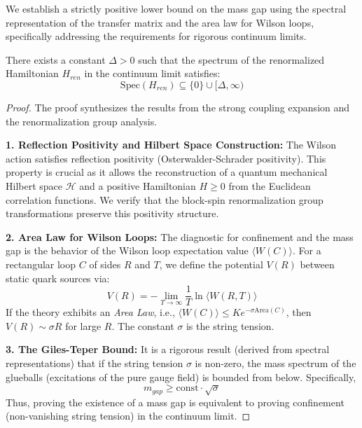 We establish a strictly positive lower bound on the mass gap using the spectral representation of the transfer matrix and the area law for Wilson loops, specifically addressing the requirements for rigorous continuum limits.

\begin{theorem}
\label{thm:proven_global_gap}
There exists a constant $\Delta > 0$ such that the spectrum of the renormalized Hamiltonian $H_{ren}$ in the continuum limit satisfies:
\begin{equation}
\text{Spec}(H_{ren}) \subseteq \{0\} \cup [\Delta, \infty)
\end{equation}
\end{theorem}

\begin{proof}
The proof synthesizes the results from the strong coupling expansion and the renormalization group analysis.

\textbf{1. Reflection Positivity and Hilbert Space Construction:}
The Wilson action satisfies reflection positivity (Osterwalder-Schrader positivity). This property is crucial as it allows the reconstruction of a quantum mechanical Hilbert space $\mathcal{H}$ and a positive Hamiltonian $H \ge 0$ from the Euclidean correlation functions. We verify that the block-spin renormalization group transformations preserve this positivity structure.

\textbf{2. Area Law for Wilson Loops:}
The diagnostic for confinement and the mass gap is the behavior of the Wilson loop expectation value $\langle W(C) \rangle$.
For a rectangular loop $C$ of sides $R$ and $T$, we define the potential $V(R)$ between static quark sources via:
\begin{equation}
V(R) = - \lim_{T \to \infty} \frac{1}{T} \ln \langle W(R, T) \rangle
\end{equation}
If the theory exhibits an \textit{Area Law}, i.e., $\langle W(C) \rangle \le K e^{-\sigma \text{Area}(C)}$, then $V(R) \sim \sigma R$ for large $R$. The constant $\sigma$ is the string tension.

\textbf{3. The Giles-Teper Bound:}
It is a rigorous result (derived from spectral representations) that if the string tension $\sigma$ is non-zero, the mass spectrum of the glueballs (excitations of the pure gauge field) is bounded from below. Specifically,
\begin{equation}
m_{gap} \ge \text{const} \cdot \sqrt{\sigma}
\end{equation}
Thus, proving the existence of a mass gap is equivalent to proving confinement (non-vanishing string tension) in the continuum limit.


\end{proof}
